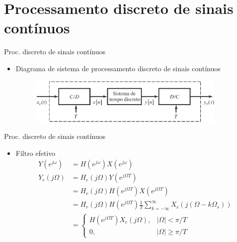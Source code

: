 \section{Processamento discreto de sinais contínuos}
\begin{slide}{Proc. discreto de sinais cont\'inuos}
\begin{itemize}
   \item Diagrama de sistema de processamento discreto de sinais cont\'inuos
   \begin{figure}
      \centering
      \includegraphics[width=0.9\textwidth]{figs/procdiscreto.eps}
   \end{figure}
\end{itemize}
\end{slide}

\begin{slide}{Proc. discreto de sinais cont\'inuos}
\begin{itemize}
   \item Filtro efetivo
   \begin{align}
      Y(e^{j\omega}) &= H(e^{j\omega}) X(e^{j\omega})\\
      Y_r(j\Omega)   &= H_r(j\Omega)Y(e^{j\Omega T})\\
                     &= H_r(j\Omega)H(e^{j\Omega T}) X(e^{j\Omega T})\\
                     &= H_r(j\Omega)H(e^{j\Omega T})\frac{1}{T}\sum_{k=-\infty}^{\infty}X_c(j(\Omega-k\Omega_s))\\
                     &= \begin{cases} H(e^{j\Omega T}) X_c(j\Omega), & |\Omega|<\pi /T \\
                                      0,                             & |\Omega|\geq\pi /T
                        \end{cases}
   \end{align}
\end{itemize}
\end{slide}

